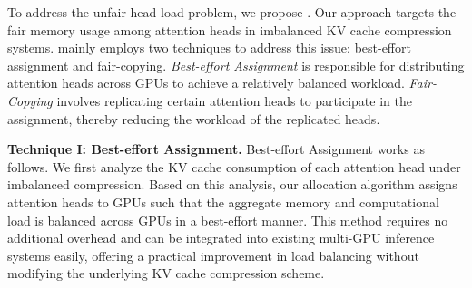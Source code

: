 To address the unfair head load problem, we propose \AlgName{}. Our approach targets the fair memory usage among attention heads in imbalanced KV cache compression systems. \AlgName{} mainly employs two techniques to address this issue: best-effort assignment and fair-copying.
 \textit{Best-effort Assignment} is responsible for distributing attention heads across GPUs to achieve a relatively balanced workload.
 \textit{Fair-Copying} involves replicating certain attention heads to participate in the assignment, thereby reducing the workload of the replicated heads.
%
%


\noindent\textbf{Technique I: Best-effort Assignment.}
%
Best-effort Assignment works as follows.
We first analyze the KV cache consumption of each attention head under imbalanced compression. Based on this analysis, our allocation algorithm assigns attention heads to GPUs such that the aggregate memory and computational load is balanced across GPUs in a best-effort manner. This method requires no additional overhead and can be integrated into existing multi-GPU inference systems easily, offering a practical improvement in load balancing without modifying the underlying KV cache compression scheme.
%


